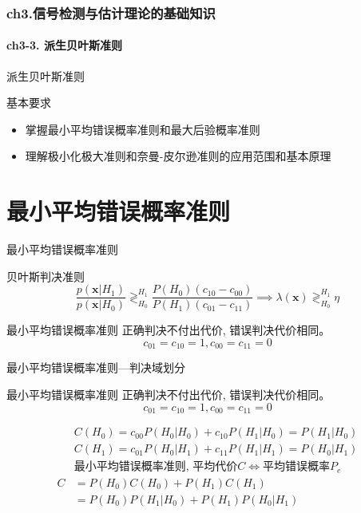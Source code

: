 \begin{frame}[shrink]
  \frametitle{ch3.信号检测与估计理论的基础知识}
  \framesubtitle{ch3-3. 派生贝叶斯准则}
  \tableofcontents[hideallsubsections]
\end{frame}

\begin{frame}{派生贝叶斯准则}
\begin{block}{基本要求}
	\begin{itemize} 
		\item 掌握最小平均错误概率准则和最大后验概率准则
		\item 理解极小化极大准则和奈曼-皮尔逊准则的应用范围和基本原理
	\end{itemize}
\end{block}
\end{frame}

\section{最小平均错误概率准则}

\begin{frame}{最小平均错误概率准则}
\begin{block}{贝叶斯判决准则}
	\[ \frac{p(\bm{x}|H_1)}{p(\bm{x}|H_0)}\mathop{\gtrless}_{H_0}^{H_1}\frac{P(H_0)(c_{10}-c_{00})}{P(H_1)(c_{01}-c_{11})} \implies \lambda(\bm{x})\mathop{\gtrless}_{H_0}^{H_1}\eta \]
\end{block}
\begin{block}{最小平均错误概率准则}
	正确判决不付出代价, 错误判决代价相同。
	\[c_{01}=c_{10}=1, c_{00}=c_{11}=0\]
\end{block}
\end{frame}

\begin{frame}[shrink]{最小平均错误概率准则---判决域划分}
\begin{block}{最小平均错误概率准则}
	正确判决不付出代价, 错误判决代价相同。
	\[c_{01}=c_{10}=1, c_{00}=c_{11}=0\]
\end{block}
\begin{align*}
&C(H_0)=c_{00}P(H_0|H_0)+c_{10}P(H_1|H_0)=P(H_1|H_0)\\
&C(H_1)=c_{01}P(H_0|H_1)+c_{11}P(H_1|H_1)=P(H_0|H_1)\\
&\textbf{最小平均错误概率准则, 平均代价$C$}\Leftrightarrow\textbf{平均错误概率$P_e$}\\
C&=P(H_0)C(H_0)+P(H_1)C(H_1)\\
&=P(H_0)P(H_1|H_0)+P(H_1)P(H_0|H_1)
\end{align*}
\end{frame}

